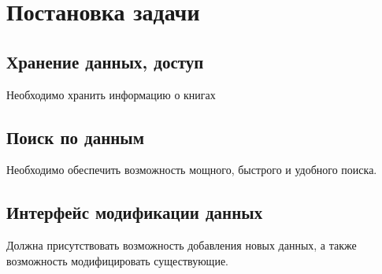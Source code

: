 
\section{Постановка задачи}

\subsection{Хранение данных, доступ}

Необходимо хранить информацию о книгах

\subsection{Поиск по данным}

Необходимо обеспечить возможность мощного, быстрого и удобного поиска.

\subsection{Интерфейс модификации данных}

Должна присутствовать возможность добавления новых данных, 
а также возможность модифицировать существующие.

